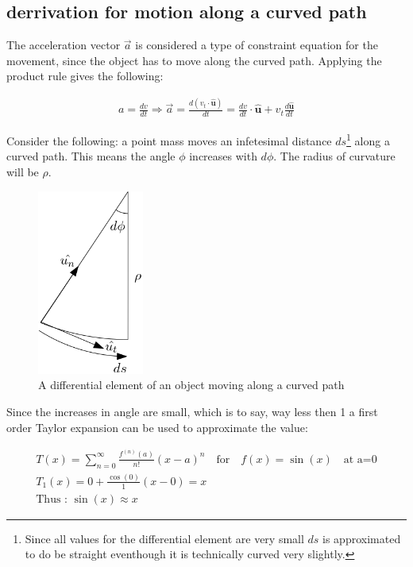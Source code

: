 \documentclass[11pt, a4paper]{article}
\begin{document}
\subsection{derrivation for motion along a curved path}
The acceleration vector $\vec{a}$ is considered a type of constraint equation for the movement, 
since the object has to move along the curved path. Applying the product rule gives the following:

\begin{gather}
    a = \frac{dv}{dt} \Rightarrow \vec{a} = \frac{d(v_t \cdot \boldsymbol{\hat{u}})}{dt} = \frac{dv}{dt} \cdot 
        \boldsymbol{\hat{u}} + v_t \frac{d\boldsymbol{\hat{u}}}{dt}
\end{gather}

Consider the following: a point mass moves an infetesimal distance $ds$\footnote{Since all values for the differential element are very small
$ds$ is approximated to do be straight eventhough it is technically curved very slightly.} along a curved path.
This means the angle $\phi$ increases with $d\phi$. The radius of curvature will be $\rho$.
\begin{figure}[h]
    \centerline{\includegraphics[width=3.5cm]{images/Differential_element.png}}
    \caption{A differential element of an object moving along a curved path}
\end{figure}
Since the increases in angle are small,
which is to say, way less then 1 a first order Taylor expansion can be used to approximate the value:

\begin{gather}
    T(x) = \sum_{n=0}^{\infty} \frac{f^{(n)}(a)}{n!} (x-a)^n \quad\text{for}\quad f(x) = \sin(x) \quad \text{at a=0}\\
    T_1(x) = 0 + \frac{\cos(0)}{1} (x-0) = x\\
    \text{Thus : } \sin(x) \approx x
\end{gather}
\end{document}
